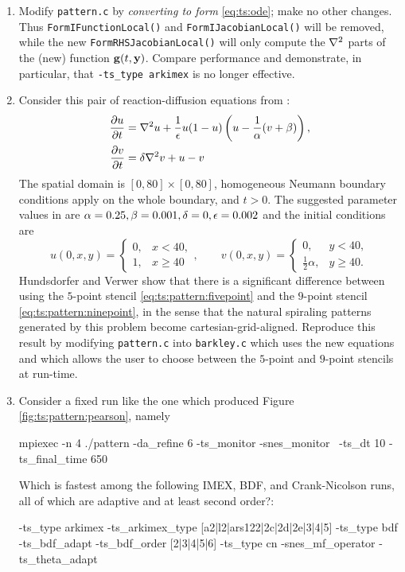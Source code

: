 \begin{enumerate}
\item \label{exer:ts:patternrhsonlyform}  Modify \texttt{pattern.c} by \emph{converting to form} \eqref{eq:ts:ode}; make no other changes.  Thus \texttt{FormIFunctionLocal()} and \texttt{FormIJacobianLocal()} will be removed, while the new \texttt{FormRHSJacobianLocal()} will only compute the $\nabla^2$ parts of the (new) function $\mathbf{g}(t,\mathbf{y})$.  Compare performance and demonstrate, in particular, that \texttt{-ts\_type arkimex} is no longer effective.

\item \label{exer:ts:barkley}  Consider this pair of reaction-diffusion equations from \citep{Barkley1995}:
\begin{align}
\frac{\partial u}{\partial t} &= \nabla^2 u + \frac{1}{\epsilon} u (1-u) \left(u - \frac{1}{\alpha} (v + \beta)\right), \label{eq:ts:pattern:barkleypde} \\
\frac{\partial v}{\partial t} &= \delta \nabla^2 v + u - v \notag
\end{align}
The spatial domain is $[0,80]\times[0,80]$, homogeneous Neumann boundary conditions apply on the whole boundary, and $t>0$.  The suggested parameter values in \citep[section III.6]{HundsdorferVerwer2003} are $\alpha=0.25,\beta=0.001,\delta=0,\epsilon=0.002$ and the initial conditions are
    $$u(0,x,y) = \begin{cases} 0, & x < 40, \\ 1, & x \ge 40 \end{cases}, \qquad
      v(0,x,y) = \begin{cases} 0, & y < 40, \\ \frac{1}{2}\alpha, & y \ge 40.\end{cases}$$
Hundsdorfer and Verwer show that there is a significant difference between using the $5$-point stencil \eqref{eq:ts:pattern:fivepoint} and the $9$-point stencil \eqref{eq:ts:pattern:ninepoint}, in the sense that the natural spiraling patterns generated by this problem become cartesian-grid-aligned.  Reproduce this result by modifying \texttt{pattern.c} into \texttt{barkley.c} which uses the new equations and which allows the user to choose between the $5$-point and $9$-point stencils at run-time.

\item \label{exer:ts:patternperformancestudy}  Consider a fixed run like the one which produced Figure \ref{fig:ts:pattern:pearson}, namely
\begin{code}
mpiexec -n 4 ./pattern -da_refine 6 -ts_monitor -snes_monitor \
    -ts_dt 10 -ts_final_time 650
\end{code}
Which is fastest among the following IMEX, BDF, and Crank-Nicolson runs, all of which are adaptive and at least second order?:
\begin{code}
-ts_type arkimex -ts_arkimex_type [a2|l2|ars122|2c|2d|2e|3|4|5]
-ts_type bdf -ts_bdf_adapt -ts_bdf_order [2|3|4|5|6]
-ts_type cn -snes_mf_operator -ts_theta_adapt
\end{code}

\end{enumerate}
